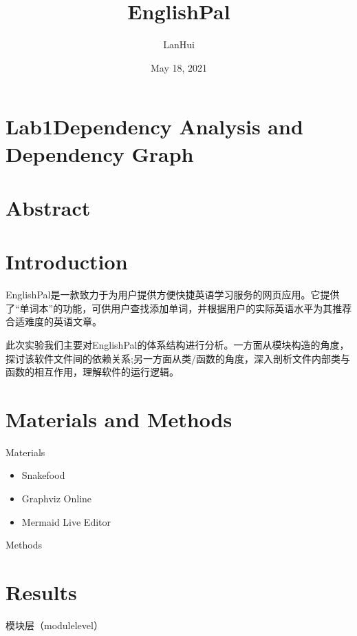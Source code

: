 \documentclass[letterpaper,10pt,english]{sphinxmanual}
\title{EnglishPal}
\date{May 18, 2021}
\author{LanHui}
\begin{document}
\pagestyle{empty}
\sphinxmaketitle
\pagestyle{plain}
\sphinxtableofcontents
\pagestyle{normal}
\label{\detokenize{index::doc}}



\chapter{Lab1\textendash{}Dependency Analysis and Dependency Graph}
\label{\detokenize{lab1:lab1-dependency-analysis-and-dependency-graph}}\label{\detokenize{lab1::doc}}

\chapter{Abstract}
\label{\detokenize{lab1:abstract}}

\chapter{Introduction}
\label{\detokenize{lab1:introduction}}
\sphinxAtStartPar
EnglishPal是一款致力于为用户提供方便快捷英语学习服务的网页应用。它提供了“单词本”的功能，可供用户查找添加单词，并根据用户的实际英语水平为其推荐合适难度的英语文章。

\sphinxAtStartPar
此次实验我们主要对EnglishPal的体系结构进行分析。一方面从模块构造的角度，探讨该软件文件间的依赖关系;另一方面从类/函数的角度，深入剖析文件内部类与函数的相互作用，理解软件的运行逻辑。


\chapter{Materials and Methods}
\label{\detokenize{lab1:materials-and-methods}}
\sphinxAtStartPar
Materials
\begin{itemize}
\item {} 
\sphinxAtStartPar
Snakefood

\item {} 
\sphinxAtStartPar
Graphviz Online

\item {} 
\sphinxAtStartPar
Mermaid Live Editor

\end{itemize}

\sphinxAtStartPar
Methods


\chapter{Results}
\label{\detokenize{lab1:results}}
\sphinxAtStartPar
模块层（module\sphinxhyphen{}level）
\end{document}

